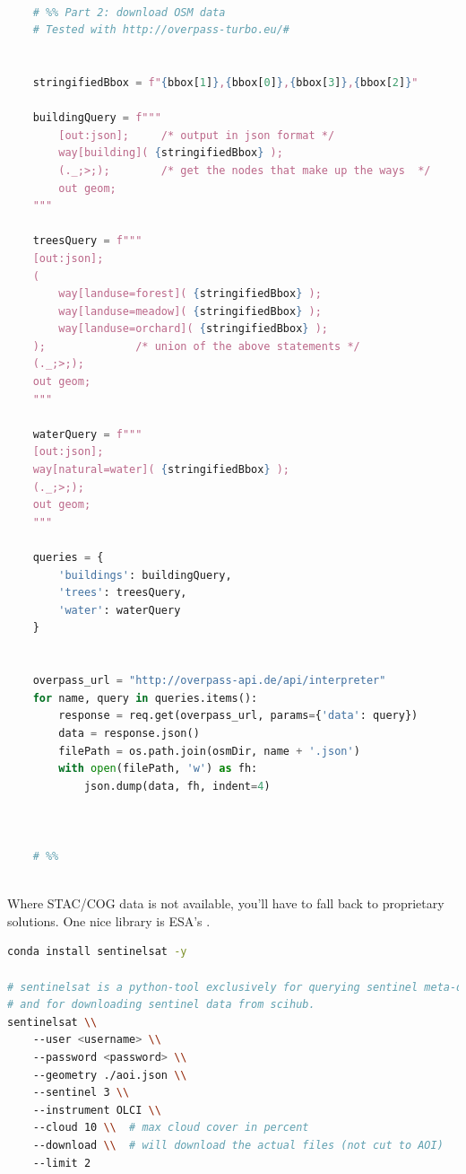 \begin{lstlisting}[language=python]
    
    # %% Part 2: download OSM data
    # Tested with http://overpass-turbo.eu/#
    
    
    stringifiedBbox = f"{bbox[1]},{bbox[0]},{bbox[3]},{bbox[2]}"
    
    buildingQuery = f"""
        [out:json];     /* output in json format */
        way[building]( {stringifiedBbox} );
        (._;>;);        /* get the nodes that make up the ways  */
        out geom;
    """
    
    treesQuery = f"""
    [out:json];
    (
        way[landuse=forest]( {stringifiedBbox} );
        way[landuse=meadow]( {stringifiedBbox} );
        way[landuse=orchard]( {stringifiedBbox} );
    );              /* union of the above statements */
    (._;>;);
    out geom;
    """
    
    waterQuery = f"""
    [out:json];
    way[natural=water]( {stringifiedBbox} );
    (._;>;);
    out geom;
    """
    
    queries = {
        'buildings': buildingQuery,
        'trees': treesQuery,
        'water': waterQuery
    }
    
    
    overpass_url = "http://overpass-api.de/api/interpreter"
    for name, query in queries.items():
        response = req.get(overpass_url, params={'data': query})
        data = response.json()
        filePath = os.path.join(osmDir, name + '.json')
        with open(filePath, 'w') as fh:
            json.dump(data, fh, indent=4)
    
    
    
    # %%
    
\end{lstlisting}


Where STAC/COG data is not available, you'll have to fall back to proprietary solutions. One nice library is ESA's .
\begin{lstlisting}[language=bash]
conda install sentinelsat -y

# sentinelsat is a python-tool exclusively for querying sentinel meta-data 
# and for downloading sentinel data from scihub.
sentinelsat \\
    --user <username> \\
    --password <password> \\
    --geometry ./aoi.json \\
    --sentinel 3 \\
    --instrument OLCI \\
    --cloud 10 \\  # max cloud cover in percent
    --download \\  # will download the actual files (not cut to AOI)
    --limit 2
\end{lstlisting}


